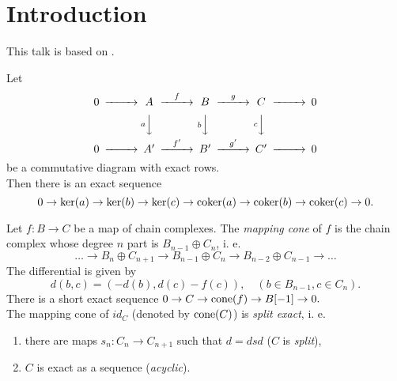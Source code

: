 \section{Introduction}
This talk is based on \cite{Wei94}.

\begin{note}\label{snake_lemma}
	Let
	\begin{align*}
		\begin{CD}
			0 @>>> A @>f>> B @>g>> C @>>> 0 \\
			@.   @VaVV   @VbVV    @VcVV    @. \\
			0 @>>> A' @>f'>> B' @>g'>> C' @>>> 0
		\end{CD}
	\end{align*}
	be a commutative diagram with exact rows. \\
	Then there is an exact sequence
	$$0 \rightarrow \ker(a) \rightarrow \ker(b) \rightarrow \ker(c) \rightarrow \operatorname{coker}(a) \rightarrow \operatorname{coker}(b) \rightarrow \operatorname{coker}(c) \rightarrow 0.$$
\end{note}

\begin{definition}
	Let $f:B \rightarrow C$ be a map of chain complexes.
	The \textit{mapping cone} of $f$ is the chain complex whose degree $n$ part is $B_{n-1} \oplus C_n$, i. e.
	\[\dots \rightarrow B_{n} \oplus C_{n+1} \rightarrow B_{n-1} \oplus C_n \rightarrow B_{n-2} \oplus C_{n-1} \rightarrow \dots\]
	The differential is given by
	\[d(b,c) = (-d(b), d(c) - f(c)), \quad (b\in B_{n-1}, c\in C_n).\]
	There is a short exact sequence $0 \rightarrow C \rightarrow \operatorname{cone}(f) \rightarrow B[-1] \rightarrow 0.$ \\
	The mapping cone of $id_C$ (denoted by $\operatorname{cone}(C)$) is \textit{split exact}, i. e.
	\begin{enumerate}[label=(\roman*)]
		\item there are maps $s_n:C_n\rightarrow C_{n+1}$ such that $d=dsd$ ($C$ is \textit{split}),
		\item $C$ is exact as a sequence (\textit{acyclic}).
	\end{enumerate} 
\end{definition}